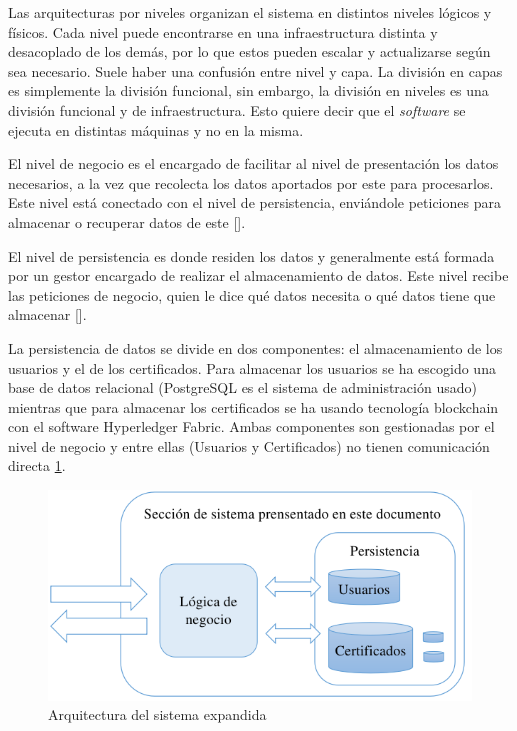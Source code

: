 Las arquitecturas por niveles organizan el sistema en distintos niveles lógicos y físicos. Cada nivel puede encontrarse en una infraestructura distinta y desacoplado de los demás, por lo que estos pueden escalar y actualizarse según sea necesario. Suele haber una confusión entre nivel y capa. La división en capas es simplemente la división funcional, sin embargo, la división en niveles es una división funcional y de infraestructura. Esto quiere decir que el \textit{software} se ejecuta en distintas máquinas y no en la misma.

El nivel de negocio es el encargado de facilitar al nivel de presentación los datos necesarios, a la vez que recolecta los datos aportados por este para procesarlos. Este nivel está conectado con el nivel de persistencia, enviándole peticiones para almacenar o recuperar datos de este [\cite{96}].

El nivel de persistencia es donde residen los datos y generalmente está formada por un gestor encargado de realizar el almacenamiento de datos. Este nivel recibe las peticiones de negocio, quien le dice qué datos necesita o qué datos tiene que almacenar [\cite{96}]. 

La persistencia de datos se divide en dos componentes: el almacenamiento de los usuarios y el de los certificados. Para almacenar los usuarios se ha escogido una base de datos relacional (PostgreSQL es el sistema de administración usado) mientras que para almacenar los certificados se ha usando tecnología blockchain con el software Hyperledger Fabric. Ambas componentes son gestionadas por el nivel de negocio y entre ellas (Usuarios y Certificados) no tienen comunicación directa \ref{fig:9}.

\begin{figure}[h]
	\centering
	\includegraphics[width=\linewidth]{Graphics/arquitectura-ex.png}
	\caption{Arquitectura del sistema expandida}
	\label{fig:9}
\end{figure}

